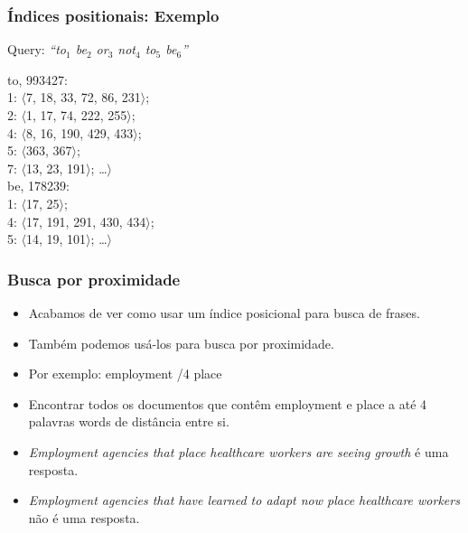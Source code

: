 \documentclass[compress]{beamer}
\def\term#1{{\sc #1}}   %
\def\query#1{{\sf #1}}
\begin{document}
\begin{frame}
\frametitle{Índices positionais: Exemplo}

\pause[2]

Query: \emph{``to$_1$ be$_2$ or$_3$ not$_4$ to$_5$ be$_6$''}

\pause[3]

\raggedright
\term{to}, 993427:\\
\hspace*{2em}\llap{$\langle$} \alert<2-6>{1}: $\langle$\alert<2,3>{7}, 
\alert<4,5>{18}, \alert<6>{33, 72, 86, 231}$\rangle$;\\
\hspace*{2em} \alert<7>{2}: $\langle$1, 17, 74, 222, 255$\rangle$; \\
\hspace*{2em} \alert<8->{4}: $\langle$\alert<9>{8}, \alert<10-12>{16}, 
\alert<12,13,14,15>{190}, \alert<15->{429}, \alert<17->{433}$\rangle$;\\
\hspace*{2em} 5: $\langle$363, 367$\rangle$; \\
\hspace*{2em} 7: $\langle$13, 23, 191$\rangle$; 
\ldots $\rangle$ \\[2ex]
\term{be}, 178239:\\
\hspace*{2em}\llap{$\langle$}  \alert<2-6>{1}: $\langle$\alert<3>{17}, 
\alert<5>{25}$\rangle$;\\
\hspace*{2em} \alert<8->{4}: $\langle$\alert<11-12>{17}, \alert<14,15>{191}, 
291, \alert<16->{430}, \alert<18->{434}$\rangle$;\\
\hspace*{2em} 5: $\langle$14, 19, 101$\rangle$; 
\ldots $\rangle$



\smallskip


\end{frame}

\begin{frame}
\frametitle{Busca por proximidade }
\begin{itemize}[<+->]
\item Acabamos de ver como usar um índice posicional para busca de 
frases.
\item Também podemos usá-los para busca por proximidade.
\item Por exemplo: \query{employment /4 place}
\item Encontrar todos os documentos que contêm \term{employment} e 
  \term{place} a até 4 palavras words de distância entre si.
\item \emph{Employment agencies that place healthcare
  workers are seeing growth} é uma resposta.
\item \emph{Employment agencies that have learned to adapt
  now place healthcare
  workers} não é uma resposta.
\end{itemize}
\end{frame}
\end{document}

